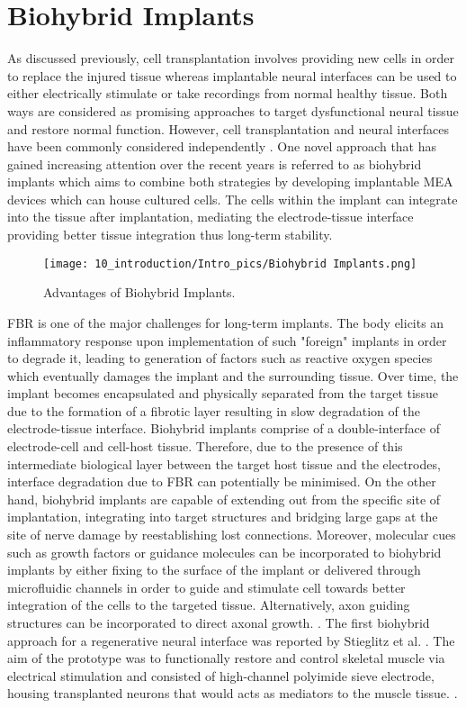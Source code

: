 \section{Biohybrid Implants}

As discussed previously, cell transplantation involves providing new cells in order to replace the injured tissue whereas implantable neural interfaces can be used to either electrically stimulate or take recordings from normal healthy tissue. Both ways are considered as promising approaches to target dysfunctional neural tissue and restore normal function. However, cell transplantation and neural interfaces have been commonly considered independently \cite{rochford2020bio}. One novel approach that has gained increasing attention over the recent years is referred to as biohybrid implants which aims to combine both strategies by developing implantable MEA devices which can house cultured cells. The cells within the implant can integrate into the tissue after implantation, mediating the electrode-tissue interface providing better tissue integration thus long-term stability.

\begin{figure}[H]
\centering
\texttt{[image: 10\_introduction/Intro\_pics/Biohybrid Implants.png]} 
\caption{Advantages of Biohybrid Implants. \cite{rochford2020bio}}
\label{fig:Biohybrid Implants}
\end{figure}
FBR is one of the major challenges for long-term implants. The body elicits an inflammatory response upon implementation of such "foreign" implants in order to degrade it, leading to generation of factors such as reactive oxygen species which eventually damages the implant and the surrounding tissue. Over time, the implant becomes encapsulated and physically separated from the target tissue due to the formation of a fibrotic layer resulting in slow degradation of the electrode-tissue interface. Biohybrid implants comprise of a double-interface of electrode-cell and cell-host tissue. Therefore, due to the presence of this intermediate biological layer between the target host tissue and the electrodes, interface degradation due to FBR can potentially be minimised. On the other hand, biohybrid implants are capable of extending out from the specific site of implantation, integrating into target structures and bridging large gaps at the site of nerve damage by reestablishing lost connections. Moreover, molecular cues such as growth factors or guidance molecules can be incorporated to biohybrid implants by either fixing to the surface of the implant or delivered through microfluidic channels in order to guide and stimulate cell towards better integration of the cells to the targeted tissue. Alternatively, axon guiding structures can be incorporated to direct axonal growth. \cite{rochford2020bio}. The first biohybrid approach for a regenerative neural interface was reported by Stieglitz et al. \cite{stieglitz2002biohybrid}. The aim of the prototype was to functionally restore and control skeletal muscle via electrical stimulation and consisted of high-channel polyimide sieve electrode, housing transplanted neurons that would acts as mediators to the muscle tissue. \cite{rochford2020bio}. 


